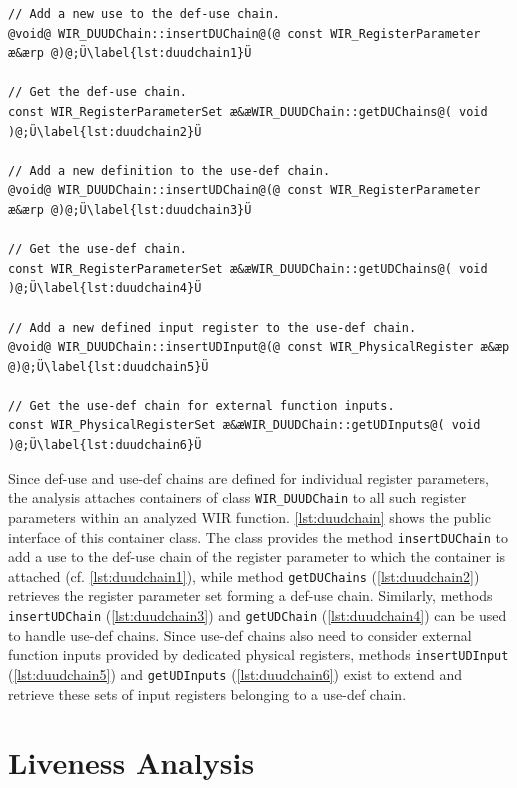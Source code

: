 \begin{lstlisting}[style=code,float=!b,caption={Def-Use/Use-Def Chain and Inputs Handling of Container Class \texttt{WIR\_DUUDChain}},label=lst:duudchain]
// Add a new use to the def-use chain.
@void@ WIR_DUUDChain::insertDUChain@(@ const WIR_RegisterParameter æ&ærp @)@;Ü\label{lst:duudchain1}Ü

// Get the def-use chain.
const WIR_RegisterParameterSet æ&æWIR_DUUDChain::getDUChains@( void )@;Ü\label{lst:duudchain2}Ü

// Add a new definition to the use-def chain.
@void@ WIR_DUUDChain::insertUDChain@(@ const WIR_RegisterParameter æ&ærp @)@;Ü\label{lst:duudchain3}Ü

// Get the use-def chain.
const WIR_RegisterParameterSet æ&æWIR_DUUDChain::getUDChains@( void )@;Ü\label{lst:duudchain4}Ü

// Add a new defined input register to the use-def chain.
@void@ WIR_DUUDChain::insertUDInput@(@ const WIR_PhysicalRegister æ&æp @)@;Ü\label{lst:duudchain5}Ü

// Get the use-def chain for external function inputs.
const WIR_PhysicalRegisterSet æ&æWIR_DUUDChain::getUDInputs@( void )@;Ü\label{lst:duudchain6}Ü
\end{lstlisting}

Since def-use and use-def chains are defined for individual register parameters, the analysis attaches containers of class \texttt{WIR\_DUUDChain} to all such register parameters within an analyzed \gls{WIR} function.
\cref{lst:duudchain} shows the public interface of this container class.
The class provides the method \texttt{insertDUChain} to add a use to the def-use chain of the register parameter to which the container is attached (cf. \cref{lst:duudchain1}), while method \texttt{getDUChains} (\cref{lst:duudchain2}) retrieves the register parameter set forming a def-use chain.
Similarly, methods \texttt{insertUDChain} (\cref{lst:duudchain3}) and \texttt{getUDChain} (\cref{lst:duudchain4}) can be used to handle use-def chains.
Since use-def chains also need to consider external function inputs provided by dedicated physical registers, methods \texttt{insertUDInput} (\cref{lst:duudchain5}) and \texttt{getUDInputs} (\cref{lst:duudchain6}) exist to extend and retrieve these sets of input registers belonging to a use-def chain.


\section{Liveness Analysis}
\label{sec:liveness}

